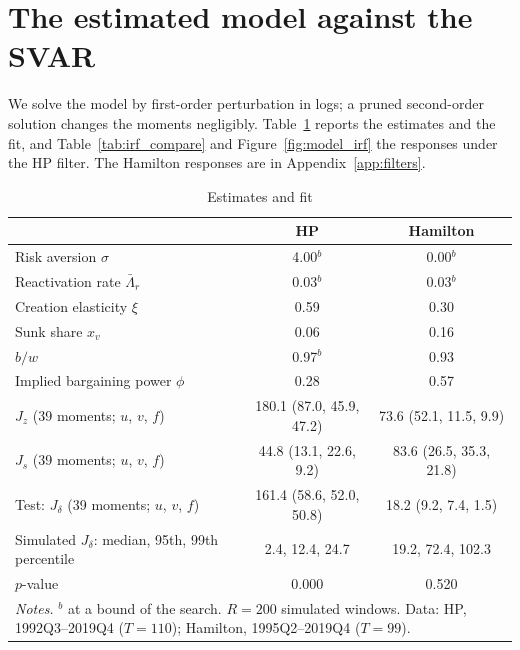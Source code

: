 \documentclass[authoryear, review, 12pt]{elsarticle}
\begin{document}
\section{The estimated model against the SVAR}\label{sec:results}

We solve the model by first-order perturbation in logs; a pruned second-order solution changes the moments negligibly.
Table~\ref{tab:estimates} reports the estimates and the fit, and Table~\ref{tab:irf_compare} and Figure~\ref{fig:model_irf} the responses under the HP filter. The Hamilton responses are in Appendix~\ref{app:filters}.

\begin{table}[H]
\centering
\caption{Estimates and fit}\label{tab:estimates}
\small
\begin{tabular}{lcc}
\toprule
 & HP & Hamilton \\
\midrule
Risk aversion $\sigma$ & 4.00$^{b}$ & 0.00$^{b}$ \\
Reactivation rate $\bar\Lambda_r$ & 0.03$^{b}$ & 0.03$^{b}$ \\
Creation elasticity $\xi$ & 0.59 & 0.30 \\
Sunk share $x_v$ & 0.06 & 0.16 \\
$b/w$ & 0.97$^{b}$ & 0.93 \\
Implied bargaining power $\phi$ & 0.28 & 0.57 \\
\midrule
$J_z$ (39 moments; $u$, $v$, $f$) & 180.1 (87.0, 45.9, 47.2) & 73.6 (52.1, 11.5, 9.9) \\
$J_s$ (39 moments; $u$, $v$, $f$) & 44.8 (13.1, 22.6, 9.2) & 83.6 (26.5, 35.3, 21.8) \\
\midrule
Test: $J_\delta$ (39 moments; $u$, $v$, $f$) & 161.4 (58.6, 52.0, 50.8) & 18.2 (9.2, 7.4, 1.5) \\
Simulated $J_\delta$: median, 95th, 99th percentile & 2.4, 12.4, 24.7 & 19.2, 72.4, 102.3 \\
$p$-value & 0.000 & 0.520 \\
\bottomrule
\multicolumn{3}{p{0.75\linewidth}}{\footnotesize \textit{Notes.} $^{b}$ at a bound of the search. $R=200$ simulated windows. Data: HP, 1992Q3--2019Q4 ($T=110$); Hamilton, 1995Q2--2019Q4 ($T=99$).}
\end{tabular}
\end{table}
\end{document}
